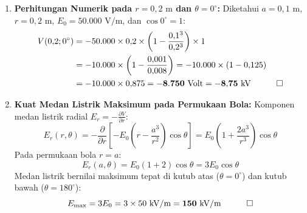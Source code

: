 \documentclass[11pt,a4paper]{article}
\theoremstyle{definition}
\begin{document}
\begin{enumerate}[leftmargin=*]
    \item \textbf{Perhitungan Numerik pada $r = 0{,}2\text{ m}$ dan $\theta = 0^\circ$:}
    Diketahui $a = 0{,}1\text{ m}$, $r = 0{,}2\text{ m}$, $E_0 = 50.000\text{ V/m}$, dan $\cos 0^\circ = 1$:
    \begin{align*}
        V(0{,}2; 0^\circ) &= -50.000 \times 0{,}2 \times \left( 1 - \frac{0{,}1^3}{0{,}2^3} \right) \times 1 \\
        &= -10.000 \times \left( 1 - \frac{0{,}001}{0{,}008} \right) = -10.000 \times (1 - 0{,}125) \\
        &= -10.000 \times 0{,}875 = \mathbf{-8.750\text{ Volt} = -8{,}75\text{ kV}} \quad \qed
    \end{align*}

    \item \textbf{Kuat Medan Listrik Maksimum pada Permukaan Bola:}
    Komponen medan listrik radial $E_r = -\frac{\partial V}{\partial r}$:
    \begin{equation*}
        E_r(r, \theta) = -\frac{\partial}{\partial r}\left[ -E_0 \left( r - \frac{a^3}{r^2} \right) \cos\theta \right] = E_0 \left( 1 + \frac{2a^3}{r^3} \right) \cos\theta
    \end{equation*}
    Pada permukaan bola $r = a$:
    \begin{equation*}
        E_r(a, \theta) = E_0 (1 + 2) \cos\theta = 3 E_0 \cos\theta
    \end{equation*}
    Medan listrik bernilai maksimum tepat di kutub atas ($\theta = 0^\circ$) dan kutub bawah ($\theta = 180^\circ$):
    \begin{equation*}
        E_{\max} = 3 E_0 = 3 \times 50\text{ kV/m} = \mathbf{150\text{ kV/m}} \quad \qed
    \end{equation*}
\end{enumerate}
\end{document}
